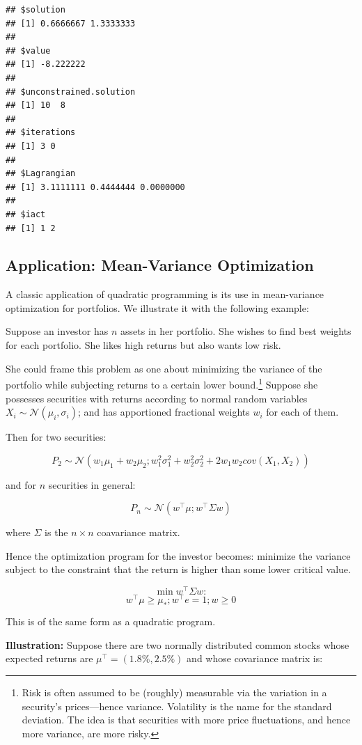 \documentclass[11pt,]{article}
\let\rmarkdownfootnote\footnote%
\def\footnote{\protect\rmarkdownfootnote}
\begin{document}
\begin{verbatim}
## $solution
## [1] 0.6666667 1.3333333
## 
## $value
## [1] -8.222222
## 
## $unconstrained.solution
## [1] 10  8
## 
## $iterations
## [1] 3 0
## 
## $Lagrangian
## [1] 3.1111111 0.4444444 0.0000000
## 
## $iact
## [1] 1 2
\end{verbatim}

\subsection{Application: Mean-Variance
Optimization}\label{application-mean-variance-optimization}

A classic application of quadratic programming is its use in
mean-variance optimization for portfolios. We illustrate it with the
following example:

Suppose an investor has \(n\) assets in her portfolio. She wishes to
find best weights for each portfolio. She likes high returns but also
wants low risk.

She could frame this problem as one about minimizing the variance of the
portfolio while subjecting returns to a certain lower bound.\footnote{Risk
  is often assumed to be (roughly) measurable via the variation in a
  security's prices---hence variance. Volatility is the name for the
  standard deviation. The idea is that securities with more price
  fluctuations, and hence more variance, are more risky.} Suppose she
possesses securities with returns according to normal random variables
\(X_i\sim \mathcal{N}(\mu_i, \sigma_i)\); and has apportioned fractional
weights \(w_i\) for each of them.

Then for two securities:

\[P_2 \sim \mathcal{N}(w_1\mu_1+w_2\mu_2; w_1^2\sigma_1^2+w_2^2\sigma_2^2+2w_1w_2cov(X_1,X_2))\]

and for \(n\) securities in general:

\[P_n \sim \mathcal{N}(w^{\top}\mu; w^{\top}\Sigma w)\]

where \(\Sigma\) is the \(n\times n\) coavariance matrix.

Hence the optimization program for the investor becomes: minimize the
variance subject to the constraint that the return is higher than some
lower critical value.

\[\min{} w^{\top}\Sigma w:\]
\[w^{\top}\mu \geq \mu_*; w^{\top}e = 1; w\geq 0\]

This is of the same form as a quadratic program.

\textbf{Illustration:} Suppose there are two normally distributed common
stocks whose expected returns are \(\mu^{\top} = (1.8\%, 2.5\%)\) and
whose covariance matrix is:
\end{document}

